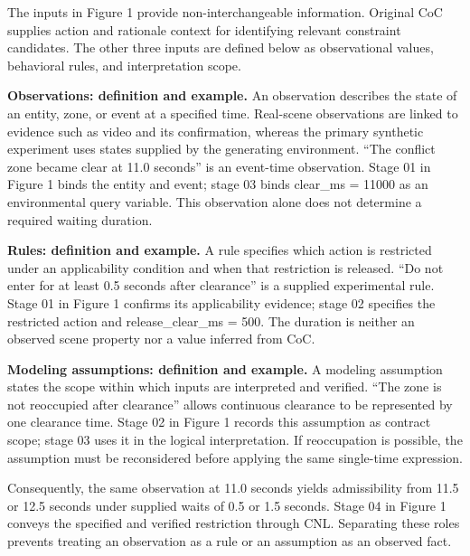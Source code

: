 \documentclass[nolineno]{ieeeaccess}
\begin{document}
The inputs in Figure 1 provide non-interchangeable information. Original CoC supplies action and rationale context for identifying relevant constraint candidates. The other three inputs are defined below as observational values, behavioral rules, and interpretation scope.\par

\textbf{Observations: definition and example.} An observation describes the state of an entity, zone, or event at a specified time. Real-scene observations are linked to evidence such as video and its confirmation, whereas the primary synthetic experiment uses states supplied by the generating environment. “The conflict zone became clear at 11.0 seconds” is an event-time observation. Stage 01 in Figure 1 binds the entity and event; stage 03 binds clear\_ms = 11000 as an environmental query variable. This observation alone does not determine a required waiting duration.\par

\textbf{Rules: definition and example.} A rule specifies which action is restricted under an applicability condition and when that restriction is released. “Do not enter for at least 0.5 seconds after clearance” is a supplied experimental rule. Stage 01 in Figure 1 confirms its applicability evidence; stage 02 specifies the restricted action and release\_clear\_ms = 500. The duration is neither an observed scene property nor a value inferred from CoC.\par

\textbf{Modeling assumptions: definition and example.} A modeling assumption states the scope within which inputs are interpreted and verified. “The zone is not reoccupied after clearance” allows continuous clearance to be represented by one clearance time. Stage 02 in Figure 1 records this assumption as contract scope; stage 03 uses it in the logical interpretation. If reoccupation is possible, the assumption must be reconsidered before applying the same single-time expression.\par

Consequently, the same observation at 11.0 seconds yields admissibility from 11.5 or 12.5 seconds under supplied waits of 0.5 or 1.5 seconds. Stage 04 in Figure 1 conveys the specified and verified restriction through CNL. Separating these roles prevents treating an observation as a rule or an assumption as an observed fact.\par
\end{document}
